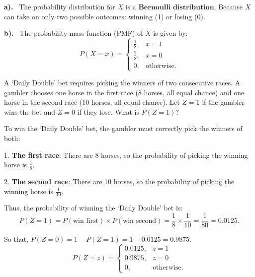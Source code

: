 \documentclass[a4paper, 10pt]{article}
\begin{document}
\begin{solution}
\par\noindent\textbf{a).} \, The probability distribution for \( X \) is a \( \boxed{\textbf{Bernoulli distribution}} \).
Because \( X \) can take on only two possible outcomes: winning (1) or losing (0).

\vspace{2mm}

\par\noindent\textbf{b).} \, The probability mass function (PMF) of \( X \) is given by:
\[\boxed{
    P(X = x) =
    \begin{cases}
    \frac{1}{8}, & x=1\\
    \frac{7}{8}, & x=0\\
    0, & \text{otherwise.}
    \end{cases}
}\]
\end{solution}


\begin{problem}
A `Daily Double' bet requires picking the winners of two consecutive races.
A gambler chooses one horse in the first race (8 horses, all equal chance) and
one horse in the second race (10 horses, all equal chance).
Let \( Z = 1 \) if the gambler wins the bet and \( Z = 0 \) if they lose. What is \( P(Z = 1) \)?
\end{problem}

\begin{solution}
To win the `Daily Double' bet, the gambler must correctly pick the winners of both:
\par 1. \textbf{The first race}: There are 8 horses, so the probability of picking the winning horse is \( \frac{1}{8} \).
\par 2. \textbf{The second race}: There are 10 horses, so the probability of picking the winning horse is \( \frac{1}{10} \).

\vspace{2mm}

Thus, the probability of winning the `Daily Double' bet is:
\[
    P(Z = 1) = P(\text{win first}) \times P(\text{win second}) = \frac{1}{8} \times \frac{1}{10} = \frac{1}{80} = \boxed{0.0125}.
\]

So that, \( P(Z = 0) = 1 - P(Z = 1) = 1 - 0.0125 = 0.9875 \).
\[
    P(Z = z) =
    \begin{cases}
    0.0125, & z=1\\
    0.9875, & z=0\\
    0, & \text{otherwise.}
    \end{cases}
\]

\end{solution}
\end{document}
